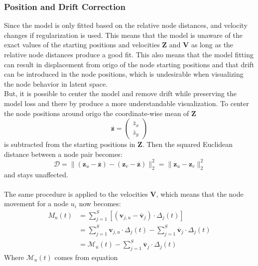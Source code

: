 \subsubsection{Position and Drift Correction}
\label{sec:Method:ProposedModel:PositionCorrection}
Since the model is only fitted based on the relative node distances, and velocity changes if regularization is used. This means that the model is unaware of the exact values of the starting positions and velocities $\textbf{Z}$ and $\textbf{V}$ as long as the relative node distances produce a good fit. This also means that the model fitting can result in displacement from origo of the node starting positions and that drift can be introduced in the node positions, which is undesirable when visualizing the node behavior in latent space.
\\
But, it is possible to center the model and remove drift while preserving the model loss and there by produce a more understandable visualization. 
To center the node positions around origo the coordinate-wise mean of $\textbf{Z}$
\begin{equation}
        \overline{\textbf{z}} = 
    \begin{pmatrix}
        \overline{z}_x \\
        \overline{z}_y
    \end{pmatrix}
\end{equation}
is subtracted from the starting positions in $\textbf{Z}$. Then the squared Euclidean distance between a node pair becomes:
\begin{equation}
    \mathcal{D} =\rVert (\textbf{z}_u-\overline{\textbf{z}}) - (\textbf{z}_v-\overline{\textbf{z}}) \rVert_2^2 = 
    \rVert \textbf{z}_u - \textbf{z}_v \rVert_2^2 
\end{equation}
and stays unaffected.
\\\\
The same procedure is applied to the velocities $\textbf{V}$, which means that the node movement for a node $u_i$ now becomes:
\begin{align}
    M_u(t) &= \sum_{j=1}^S \left[(\textbf{v}_{j,u} - \overline{\textbf{v}}_j) \cdot \Delta_{j}(t) \right] \\
    &= \sum_{j=1}^S \textbf{v}_{j, u} \cdot \Delta_{j}(t) - \sum_{j=1}^S \overline{\textbf{v}}_j \cdot \Delta_{j}(t) \\
    &= \mathcal{M}_u(t) - \sum_{j=1}^S \overline{\textbf{v}}_j \cdot \Delta_{j}(t)
\end{align}
Where $\mathcal{M}_u(t)$ comes from equation
